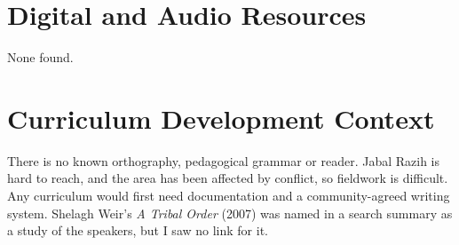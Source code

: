 \documentclass[12pt]{article}
\begin{document}
\section{Digital and Audio Resources}
None found.

\section{Curriculum Development Context}
There is no known orthography, pedagogical grammar or reader. Jabal Razih is hard to reach, and the area has been affected by conflict, so fieldwork is difficult. Any curriculum would first need documentation and a community-agreed writing system. Shelagh Weir's \emph{A Tribal Order} (2007) was named in a search summary as a study of the speakers, but I saw no link for it.
\end{document}
